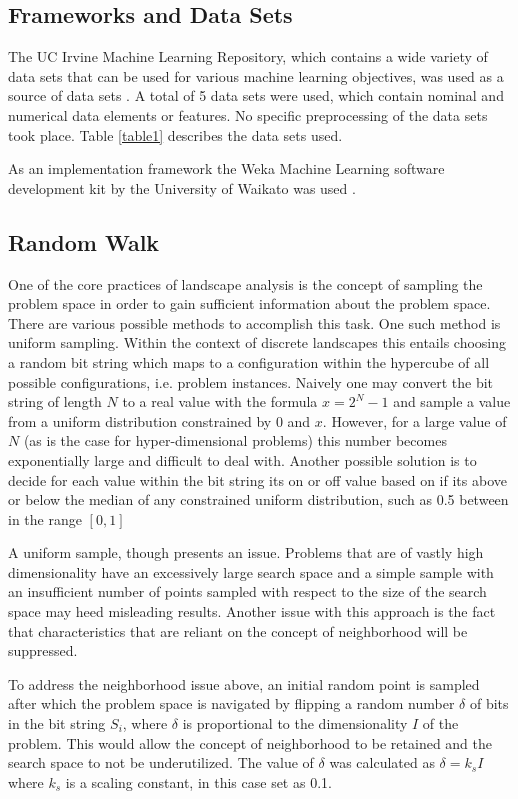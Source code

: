 \documentclass[journal,comsoc]{IEEEtran}
\begin{document}
\subsection{Frameworks and Data Sets}

The UC Irvine Machine Learning Repository, which contains a wide variety of data sets that can be used for various machine learning objectives, was used as a source of data sets \cite{UCI}. A total of 5 data sets were used, which contain nominal and numerical data elements or features. No specific preprocessing of the data sets took place. Table \ref{table1} describes the data sets used.

As an implementation framework the Weka Machine Learning software development kit by the University of Waikato was used \cite{weka}. 

\subsection{Random Walk}

One of the core practices of landscape analysis is the concept of sampling the problem space in order to gain sufficient information about the problem space. There are various possible methods to accomplish this task. One such method is uniform sampling. Within the context of discrete landscapes this entails choosing a random bit string which maps to a configuration within the hypercube of all possible configurations, i.e. problem instances. Naively one may convert the bit string of length $N$ to a real value with the formula $x = 2^N-1$ and sample a value from a uniform distribution constrained by 0 and $x$. However, for a large value of $N$ (as is the case for hyper-dimensional problems) this number becomes exponentially large and difficult to deal with. Another possible solution is to decide for each value within the bit string its on or off value based on if its above or below the median of any constrained uniform distribution, such as 0.5 between in the range $[0,1]$

 A uniform sample, though presents an issue. Problems that are of vastly high dimensionality have an excessively large search space and a simple sample with an insufficient number of points sampled with respect to the size of the search space may heed misleading results. Another issue with this approach is the fact that characteristics that are reliant on the concept of neighborhood will be suppressed.

To address the neighborhood issue above, an initial random point is sampled after which the problem space is navigated by flipping a random number $\delta$ of bits in the bit string $S_i$, where $\delta$ is proportional to the dimensionality $I$ of the problem. This would allow the concept of neighborhood to be retained and the search space to not be underutilized. The value of $\delta$ was calculated as $\delta = k_sI$ where $k_s$ is a scaling constant, in this case set as 0.1. 
\end{document}
